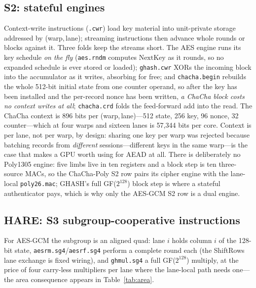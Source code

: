 \documentclass[conference]{IEEEtran}
\begin{document}
\subsection{S2: stateful engines}
Context-write instructions (\texttt{.cwr}) load key material into
unit-private storage addressed by (warp,\,lane); streaming instructions then
advance whole rounds or blocks against it. Three folds keep the streams
short. The AES engine runs its key schedule \emph{on the fly}
(\texttt{aes.rndm} computes $\mathrm{NextKey}$ as it rounds, so no expanded
schedule is ever stored or loaded); \texttt{ghash.cwr} XORs the incoming
block into the accumulator as it writes, absorbing for free; and
\texttt{chacha.begin} rebuilds the whole 512-bit initial state from one
counter operand, so after the key has been installed and the per-record nonce
has been written, \emph{a ChaCha block costs no context writes at all};
\texttt{chacha.crd} folds the
feed-forward add into the read. The ChaCha context is 896 bits per
(warp,\,lane)---512 state, 256 key, 96 nonce, 32 counter---which at four
warps and sixteen lanes is 57{,}344 bits per core. Context is per lane, not
per warp, by design: sharing one key per warp was rejected because batching
records from \emph{different} sessions---different keys in the same
warp---is the case that makes a GPU worth using for AEAD at all.
There is deliberately no Poly1305 engine: five limbs live in ten registers
and a block step is ten three-source MACs, so the ChaCha-Poly S2 row pairs
its cipher engine with the lane-local \texttt{poly26.mac}; GHASH's full
GF($2^{128}$) block step is where a stateful authenticator pays, which is
why only the AES-GCM S2 row is a dual engine.

\subsection{HARE: S3 subgroup-cooperative instructions}
For AES-GCM the subgroup is an aligned quad: lane $i$ holds column $i$ of
the 128-bit state, \texttt{aesrm.sg4}/\texttt{aesrf.sg4} perform a complete
round each (the ShiftRows lane exchange is fixed wiring), and
\texttt{ghmul.sg4} a full GF($2^{128}$) multiply, at the price of four
carry-less multipliers per lane where the lane-local path needs one---the
area consequence appears in Table~\ref{tab:area}.
\end{document}
